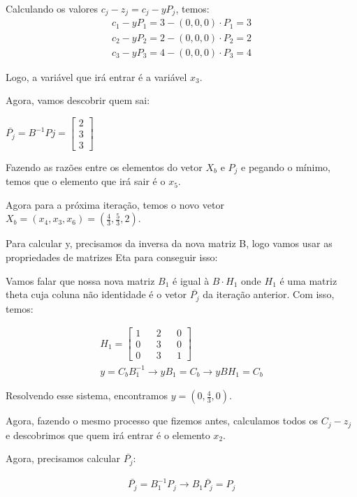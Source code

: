 \documentclass[11pt]{article}
\begin{document}
Calculando os valores \(c_j-z_j = c_j-yP_j\), temos:
\begin{align*}
  c_{1} - yP_{1} = 3 - (0, 0, 0)\cdot P_{1} = 3\\
  c_{2} - yP_{2} = 2 - (0, 0, 0)\cdot P_{2} = 2\\
  c_{3} - yP_{3} = 4 - (0, 0, 0)\cdot P_{3} = 4
\end{align*}

Logo, a variável que irá entrar é a variável \(x_3\).

Agora, vamos descobrir quem sai:

$\bar{P_{j}} = B^{-1}Pj =
\begin{bmatrix}
  2 \\
  3 \\
  3
\end{bmatrix}$

Fazendo as razões entre os elementos do vetor \(X_b\) e \(P_j\) e pegando o mínimo, temos que o elemento que irá sair é o \(x_5\).

Agora para a próxima iteração, temos o novo vetor \(X_b = (x_4, x_3, x_6) = (\frac{4}{3}, \frac{5}{3}, 2)\).

Para calcular y, precisamos da inversa da nova matriz B, logo vamos usar as propriedades de matrizes Eta para conseguir isso:

Vamos falar que nossa nova matriz \(B_1\) é igual à \(B\cdot H_1\) onde \(H_1\) é uma matriz theta cuja coluna não identidade é o vetor \(\bar{P_j}\) da
iteração anterior. Com isso, temos:

\begin{align*}
  H_{1} =
  \begin{bmatrix}
	1 && 2 && 0\\
    0 && 3 && 0\\
    0 && 3 && 1
  \end{bmatrix}\\
  y = C_{b}B_{1}^{-1} \rightarrow yB_{1} = C_{b} \rightarrow yBH_{1} = C_{b}
\end{align*}

Resolvendo esse sistema, encontramos \(y = (0, \frac{4}{3}, 0)\).

Agora, fazendo o mesmo processo que fizemos antes, calculamos todos os \(C_j-z_j\) e descobrimos que quem irá entrar é o elemento \(x_2\).

Agora, precisamos calcular \(\bar{P_j}\):

\begin{align*}
  \bar{P_{j}} = B_{1}^{-1} P_{j} \rightarrow B_{1}\bar{P_{j}} = P_{j}
\end{align*}
\end{document}
